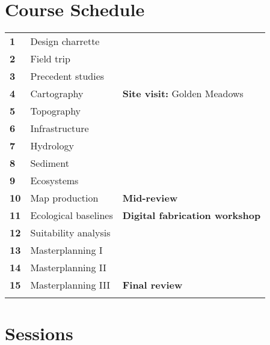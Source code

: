 \documentclass[11pt,article,oneside]{memoir}
\begin{document}


\clearpage

\section{Course Schedule}

\begin{table}[H]
\small
\begin{tabular}{l l @{\hskip 1cm}l}
%
\textbf{1} & Design charrette\\
\textbf{2} & Field trip\\
\textbf{3} & Precedent studies\\
\textbf{4} & Cartography & \textbf{Site visit:} Golden Meadows\\
\textbf{5} & Topography\\
\textbf{6} & Infrastructure\\
\textbf{7} & Hydrology\\
\textbf{8} & Sediment\\
\textbf{9} & Ecosystems\\
\textbf{10} & Map production & \textbf{Mid-review}\\
\textbf{11} & Ecological baselines & \textbf{Digital fabrication workshop}\\
\textbf{12} & Suitability analysis\\
\textbf{13} & Masterplanning I\\
\textbf{14} & Masterplanning II\\
\textbf{15} & Masterplanning III & \textbf{Final review}\\\\
%
\end{tabular}
\end{table}


\section{Sessions}
\end{document}
